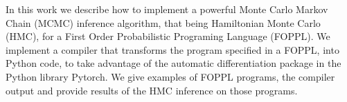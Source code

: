 In this work we describe how to implement a powerful Monte Carlo Markov Chain (MCMC) inference algorithm, that being Hamiltonian Monte Carlo (HMC), for a First Order Probabilistic Programing Language (FOPPL). We implement a compiler that transforms the program specified in a FOPPL, into Python code, to take advantage of the automatic differentiation package in the Python library Pytorch. We give examples of FOPPL programs, the compiler output and provide results of the HMC inference on those programs.